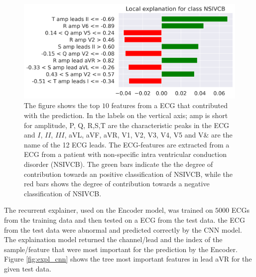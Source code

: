 \begin{figure}[!htp]
    \centering
    \includegraphics[width=.90\textwidth]{Figures/conduction_disorder_12lead.png}
    \caption{The figure shows the top $10$ features from a ECG that contributed with the prediction. In the labels on the vertical axis; amp is short for amplitude, P, Q, R,S,T are the characteristic peaks in the ECG and $I$, $II$, $III$, aVL, aVF, aVR, V1, V2, V3, V4, V5 and V& are the name of the 12 ECG leads. The ECG-features are extracted from a ECG from a patient with non-specific intra ventricular conduction disorder (NSIVCB).  The green bars indicate the the degree of contribution towards an positive classification of NSIVCB, while the red bars shows the degree of contribution towards a negative classification of NSIVCB.}
    \label{fig:explainability_rand_12}
\end{figure}

The recurrent explainer, used on the Encoder model, was trained on $5000$ ECGs from the training data and then tested on a ECG from the test data. the ECG from the test data were abnormal and predicted correctly by the CNN model. The explaination model returned the channel/lead and the index of the sample/feature that were most important for the prediction by the Encoder. Figure \ref{fig:expl_cnn} shows the tree most important features in lead aVR for the given test data.

